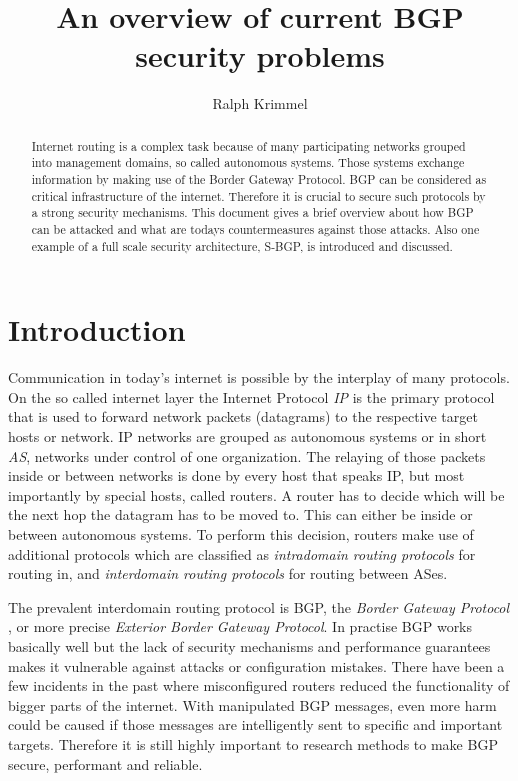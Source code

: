 \documentclass[12pt,a4paper]{IEEEtran}
\author{Ralph Krimmel}
\title{An overview of current BGP security problems}
\begin{document}
	\maketitle
	\begin{abstract}
	Internet routing is a complex task because of many participating networks grouped into management domains, so called autonomous systems.
	Those systems exchange information by making use of the Border Gateway Protocol. BGP can be considered as critical infrastructure of the internet.
	Therefore it is crucial to secure such protocols by a strong security mechanisms. This document gives a brief overview about how BGP can be attacked and what are todays countermeasures against those attacks.
	Also one example of a full scale security architecture, S-BGP, is introduced and discussed.

	\end{abstract}
	\section{Introduction}
	Communication in today's internet is possible by the interplay of many protocols. 
	On the so called internet layer the Internet Protocol \emph{IP}\citep{Postel1981e} is the primary protocol that is used to forward network packets (datagrams) to the respective target hosts or network. 
	IP networks are grouped as autonomous systems\citep{Hawkinson1996} or in short \emph{AS}, networks under control of one organization. 
	The relaying of those packets inside or between networks is done by every host that speaks IP, but most importantly by special hosts, called routers. 
	A router has to decide which will be the next hop the datagram has to be moved to. 
	This can either be inside or between autonomous systems. 
	To perform this decision, routers make use of additional protocols which are classified as \emph{intradomain routing protocols} for routing in, and \emph{interdomain routing protocols} for routing between ASes. 

	The prevalent interdomain routing protocol is BGP, the \emph{Border Gateway Protocol} \citep{Rekhter1994a}, or more precise \emph{Exterior Border Gateway Protocol}. 
	In practise BGP works basically well but the lack of security mechanisms and performance guarantees makes it vulnerable against attacks or configuration mistakes. 
	There have been a few incidents in the past where misconfigured routers reduced the functionality of bigger parts of the internet. \citep{Butler2010}
	With manipulated BGP messages, even more harm could be caused if those messages are intelligently sent to specific and important targets. 
	Therefore it is still highly important to research methods to make BGP secure, performant and reliable. 
\end{document}
